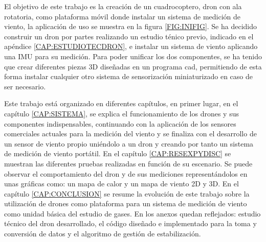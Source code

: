 El objetivo de este trabajo es la creación de un cuadrocoptero, dron con ala rotatoria, como plataforma móvil donde instalar un sistema de medición de viento, la aplicación de uso se muestra en la figura \ref{FIG:INIFIG}. Se ha decidido construir un dron por partes realizando un estudio ténico previo, indicado en el apéndice \ref{CAP:ESTUDIOTECDRON}, e instalar un sistema de viento aplicando una IMU para su medición. Para poder unificar los dos componentes, se ha tenido que crear diferentes piezas 3D diseñadas en un programa \ac{cad}, permitiendo de esta forma instalar cualquier otro sistema de sensorización miniaturizado en caso de ser necesario.

Este trabajo está organizado en diferentes capítulos, en primer lugar, en el capítulo \ref{CAP:SISTEMA}, se explica el funcionamiento de los drones y sus componentes indispensables, continuando con la aplicación de los sensores comerciales actuales para la medición del viento y se finaliza con el desarrollo de un sensor de viento propio uniéndolo a un dron y creando por tanto un sistema de medición de viento portátil. En el capítulo \ref{CAP:RESEXPYDISC} se muestran las diferentes pruebas realizadas en función de su escenario. Se puede observar el comportamiento del dron y de sus mediciones representándolos en unas gráficas como: un mapa de calor y un mapa de viento 2D y 3D. En el capítulo \ref{CAP:CONCLUSION} se resume la evolución de este trabajo sobre la utilización de drones como plataforma para un sistema de medición de viento como unidad básica del estudio de gases. En los anexos quedan reflejados: estudio técnico del dron desarrollado, el código diseñado e implementado para la toma y conversión de datos y el algoritmo de gestión de estabilización.